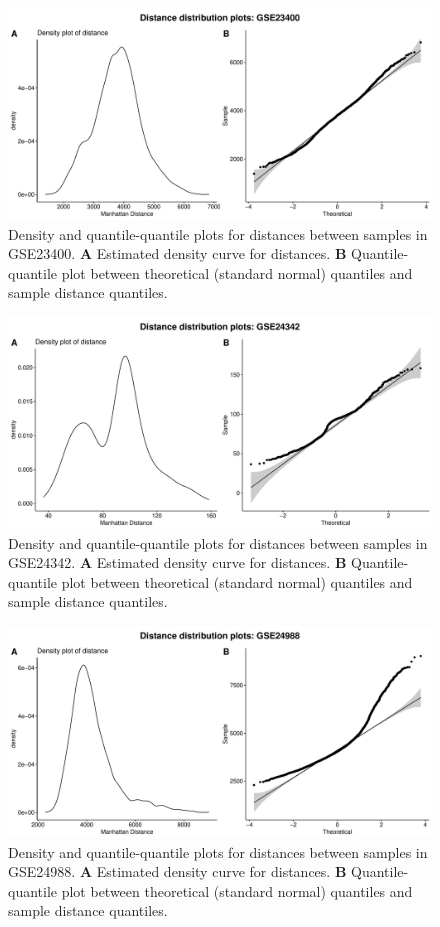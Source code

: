 \documentclass[10pt,letterpaper]{article}\usepackage[]{graphicx}\usepackage[]{color}
\begin{document}
\begin{figure}[H]
	\includegraphics[width=\textwidth]{manhattan-distance_hist_GSE23400.pdf}
	\caption{Density and quantile-quantile plots for distances between samples in GSE23400. \textbf{A} Estimated density curve for distances. \textbf{B} Quantile-quantile plot between theoretical (standard normal) quantiles and sample distance quantiles.}
\end{figure}

\begin{figure}[H]
	\includegraphics[width=\textwidth]{manhattan-distance_hist_GSE24342.pdf}
	\caption{Density and quantile-quantile plots for distances between samples in GSE24342. \textbf{A} Estimated density curve for distances. \textbf{B} Quantile-quantile plot between theoretical (standard normal) quantiles and sample distance quantiles.}
\end{figure}

\begin{figure}[H]
	\includegraphics[width=\textwidth]{manhattan-distance_hist_GSE24988.pdf}
	\caption{Density and quantile-quantile plots for distances between samples in GSE24988. \textbf{A} Estimated density curve for distances. \textbf{B} Quantile-quantile plot between theoretical (standard normal) quantiles and sample distance quantiles.}
\end{figure}
\end{document}
